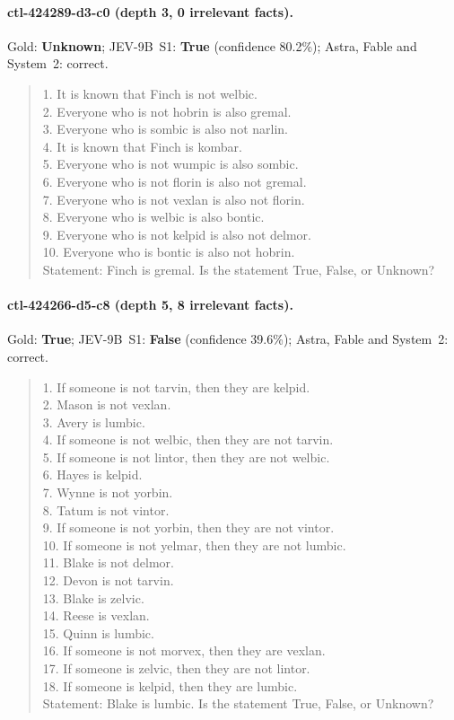 \paragraph{ctl-424289-d3-c0 (depth 3, 0 irrelevant facts).} Gold: \textbf{Unknown}; JEV-9B~S1: \textbf{True} (confidence 80.2\%); Astra, Fable and System~2: correct.
\begin{quote}\footnotesize 1. It is known that Finch is not welbic. \\ 2. Everyone who is not hobrin is also gremal. \\ 3. Everyone who is sombic is also not narlin. \\ 4. It is known that Finch is kombar. \\ 5. Everyone who is not wumpic is also sombic. \\ 6. Everyone who is not florin is also not gremal. \\ 7. Everyone who is not vexlan is also not florin. \\ 8. Everyone who is welbic is also bontic. \\ 9. Everyone who is not kelpid is also not delmor. \\ 10. Everyone who is bontic is also not hobrin. \\[2pt] Statement: Finch is gremal. Is the statement True, False, or Unknown?\end{quote}
\paragraph{ctl-424266-d5-c8 (depth 5, 8 irrelevant facts).} Gold: \textbf{True}; JEV-9B~S1: \textbf{False} (confidence 39.6\%); Astra, Fable and System~2: correct.
\begin{quote}\footnotesize 1. If someone is not tarvin, then they are kelpid. \\ 2. Mason is not vexlan. \\ 3. Avery is lumbic. \\ 4. If someone is not welbic, then they are not tarvin. \\ 5. If someone is not lintor, then they are not welbic. \\ 6. Hayes is kelpid. \\ 7. Wynne is not yorbin. \\ 8. Tatum is not vintor. \\ 9. If someone is not yorbin, then they are not vintor. \\ 10. If someone is not yelmar, then they are not lumbic. \\ 11. Blake is not delmor. \\ 12. Devon is not tarvin. \\ 13. Blake is zelvic. \\ 14. Reese is vexlan. \\ 15. Quinn is lumbic. \\ 16. If someone is not morvex, then they are vexlan. \\ 17. If someone is zelvic, then they are not lintor. \\ 18. If someone is kelpid, then they are lumbic. \\[2pt] Statement: Blake is lumbic. Is the statement True, False, or Unknown?\end{quote}
